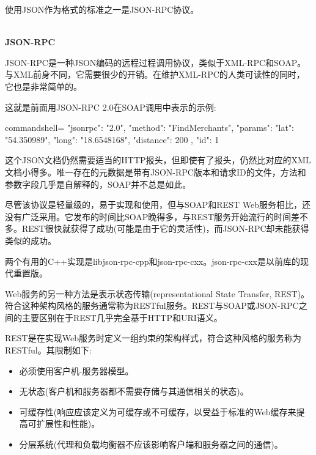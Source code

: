 使用JSON作为格式的标准之一是JSON-RPC协议。

\hspace*{\fill} \\ %
\noindent
\textbf{JSON-RPC}

JSON-RPC是一种JSON编码的远程过程调用协议，类似于XML-RPC和SOAP。与XML前身不同，它需要很少的开销。在维护XML-RPC的人类可读性的同时，它也是非常简单的。

这就是前面用JSON-RPC 2.0在SOAP调用中表示的示例:

\begin{tcblisting}{commandshell={}}
{
  "jsonrpc": "2.0",
  "method": "FindMerchants",
  "params": {
    "lat": "54.350989",
    "long": "18.6548168",
    "distance": 200
  },
  "id": 1
}
\end{tcblisting}

这个JSON文档仍然需要适当的HTTP报头，但即使有了报头，仍然比对应的XML文档小得多。唯一存在的元数据是带有JSON-RPC版本和请求ID的文件，方法和参数字段几乎是自解释的，SOAP并不总是如此。

尽管该协议是轻量级的，易于实现和使用，但与SOAP和REST Web服务相比，还没有广泛采用。它发布的时间比SOAP晚得多，与REST服务开始流行的时间差不多。REST很快就获得了成功(可能是由于它的灵活性)，而JSON-RPC却未能获得类似的成功。

两个有用的C++实现是libjson-rpc-cpp和json-rpc-cxx。json-rpc-cxx是以前库的现代重置版。


Web服务的另一种方法是表示状态传输(representational State Transfer, REST)。符合这种架构风格的服务通常称为RESTful服务。REST与SOAP或JSON-RPC之间的主要区别在于REST几乎完全基于HTTP和URI语义。

REST是在实现Web服务时定义一组约束的架构样式，符合这种风格的服务称为RESTful。其限制如下:

\begin{itemize}
\item 
必须使用客户机-服务器模型。

\item 
无状态(客户机和服务器都不需要存储与其通信相关的状态)。

\item 
可缓存性(响应应该定义为可缓存或不可缓存，以受益于标准的Web缓存来提高可扩展性和性能)。

\item 
分层系统(代理和负载均衡器不应该影响客户端和服务器之间的通信)。
\end{itemize}

